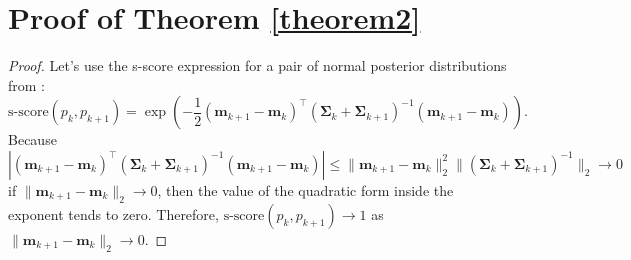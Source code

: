 \documentclass[runningheads]{llncs}
\begin{document}
\section{Proof of Theorem \ref{theorem2}}
\begin{proof}
Let's use the s-score expression for a pair of normal posterior distributions from \cite{Aduenko2017}:
\[\text{s-score}(p_k, p_{k+1}) = \exp{\left( -\dfrac{1}{2} (\mathbf{m}_{k+1} - \mathbf{m}_k)^{\top} \left( \mathbf{\Sigma}_k + \mathbf{\Sigma}_{k+1} \right)^{-1} (\mathbf{m}_{k+1} - \mathbf{m}_k) \right)}. \]
Because
    \[ \left| (\mathbf{m}_{k+1} - \mathbf{m}_k)^{\top} \left( \mathbf{\Sigma}_k + \mathbf{\Sigma}_{k+1} \right)^{-1} (\mathbf{m}_{k+1} - \mathbf{m}_k) \right| \leqslant \| \mathbf{m}_{k+1} - \mathbf{m}_k \|_2^2 \| \left( \mathbf{\Sigma}_k + \mathbf{\Sigma}_{k+1} \right)^{-1} \|_2 \to 0 \]
    if $\|\mathbf{m}_{k+1} - \mathbf{m}_k\|_2\to 0$, then the value of the quadratic form inside the exponent tends to zero. Therefore, $\text{s-score}(p_k, p_{k+1}) \to 1$ as $\|\mathbf{m}_{k+1} - \mathbf{m}_k\|_2\to 0$.
\end{proof}
\end{document}
